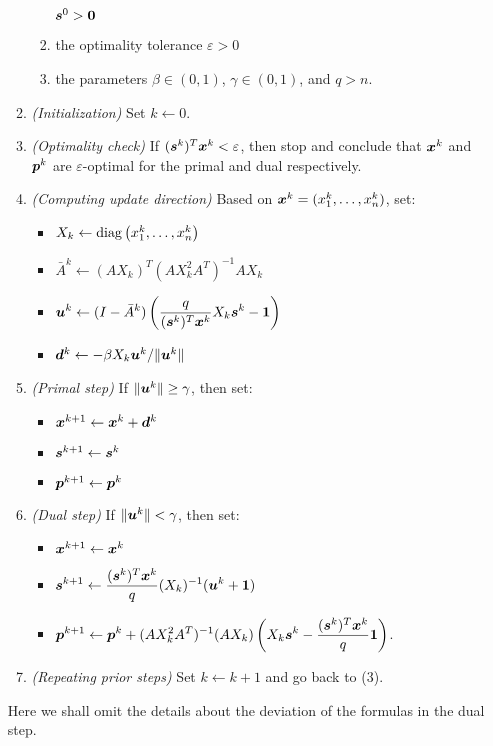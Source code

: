 \begin{enumerate}
\begin{enumerate}[label={(\arabic*)}]
\begin{enumerate}
\(\bm{s}^{0}>\bm{0}\)
\item the optimality tolerance \(\varepsilon>0\)
\item the parameters \(\beta\in (0,1)\), \(\gamma\in (0,1)\), and \(q>n\).
\end{enumerate}
\item \emph{(Initialization)} Set \(k\leftarrow 0\).
\item \emph{(Optimality check)} If
\((\bm{s}^{k})^{T}\bm{x}^{k}<\varepsilon\), then stop and conclude that
\(\bm{x}^{k}\) and \(\bm{p}^{k}\) are \(\varepsilon\)-optimal for the
primal and dual respectively.
\item \emph{(Computing update direction)} Based on
\(\bm{x}^{k}=(x_1^{k},\dotsc,x_n^{k})\), set:
\begin{itemize}
\item \(X_k\leftarrow\operatorname{diag}\left(x_1^{k},\dotsc,x_n^{k}\right)\)
\item \(\bar{A}^{k}\leftarrow (AX_k)^{T}(AX_k^{2}A^{T})^{-1}AX_k\)
\item \(\displaystyle \bm{u}^{k}\leftarrow (I-\bar{A}^{k})\left(\frac{q}
{(\bm{s}^{k})^{T}\bm{x}^{k}}X_k\bm{s}^{k}-\bm{1}\right)\)
\item \(\bm{d}^{k}\leftarrow -\beta X_k\bm{u}^{k}/\|\bm{u}^{k}\|\)
\end{itemize}
\item \emph{(Primal step)} If \(\|\bm{u}^{k}\|\ge\gamma\), then set:
\begin{itemize}
\item \(\bm{x}^{k+1}\leftarrow \bm{x}^{k}+\bm{d}^{k}\)
\item \(\bm{s}^{k+1}\leftarrow \bm{s}^{k}\)
\item \(\bm{p}^{k+1}\leftarrow \bm{p}^{k}\)
\end{itemize}
\item \emph{(Dual step)} If \(\|\bm{u}^{k}\|<\gamma\), then set:
\begin{itemize}
\item \(\bm{x}^{k+1}\leftarrow \bm{x}^{k}\)
\item \(\displaystyle \bm{s}^{k+1}\leftarrow
\frac{(\bm{s}^{k})^{T}\bm{x}^{k}}{q}(X_k)^{-1}(\bm{u}^{k}+\bm{1})\)
\item \(\displaystyle \bm{p}^{k+1}\leftarrow \bm{p}^{k}
+(AX_k^{2}A^{T})^{-1}(AX_{k})
\left(X_k\bm{s}^{k}-\frac{(\bm{s}^{k})^{T}\bm{x}^{k}}{q}\bm{1}\right)\).
\end{itemize}
\item \emph{(Repeating prior steps)} Set \(k\leftarrow k+1\) and go back to (3).
\end{enumerate}
\begin{note}
Here we shall omit the details about the deviation of the formulas in the dual
step.
\end{note}
\end{enumerate}
